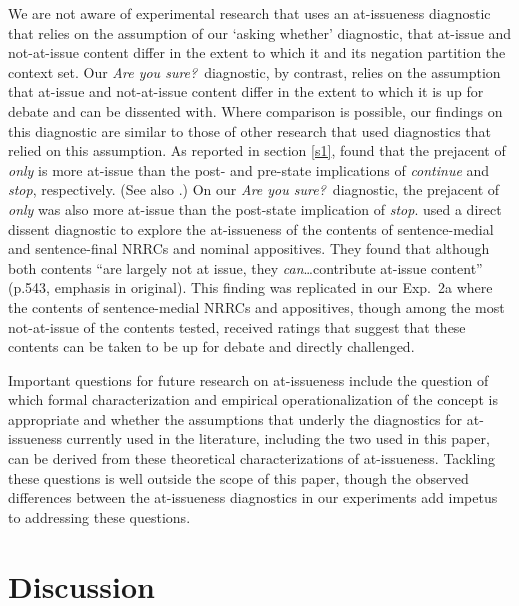 \documentclass[11pt,fleqn]{article}
\newcommand{\6}{\mbox{$[\hspace*{-.6mm}[$}}
\newcommand{\9}{\mbox{$]\hspace*{-.6mm}]$}}
\begin{document}
We are not aware of experimental research that uses an at-issueness diagnostic that relies on the assumption of our `asking whether' diagnostic, that at-issue and not-at-issue content differ in the extent to which it and its negation partition the context set. Our {\em Are you sure?}~diagnostic, by contrast, relies on the assumption that at-issue and not-at-issue content differ in the extent to which it is up for debate and can be dissented with. Where comparison is possible, our findings on this diagnostic are similar to those of other research that used diagnostics that relied on this assumption. As reported in section \ref{s1}, \citet{amaral-etal11} found that the prejacent of {\em only} is more at-issue than the post- and pre-state implications of {\em continue} and {\em stop}, respectively. (See also \citealt{cummins-etal2012}.) On our {\em Are you sure?}~diagnostic, the prejacent of {\em only} was also more at-issue than the post-state implication of {\em stop}. \citet{syrett-koev2015} used a direct dissent diagnostic to explore the at-issueness of the contents of sentence-medial and sentence-final NRRCs and nominal appositives. They found that although both contents ``are largely not at issue, they {\em can}\ldots contribute at-issue content'' (p.543, emphasis in original). This finding was replicated in our Exp.~2a where the contents of sentence-medial NRRCs and appositives, though among the most not-at-issue of the contents tested, received ratings that suggest that these contents can be taken to be up for debate and directly challenged.

Important questions for future research on at-issueness include the question of which formal characterization and empirical operationalization of the concept is appropriate and whether the assumptions that underly the diagnostics for at-issueness currently used in the literature, including the two used in this paper, can be derived from these theoretical characterizations of at-issueness. Tackling these questions is well outside the scope of this paper, though the observed differences between the at-issueness diagnostics in our experiments add impetus to addressing these questions.


 



\section{Discussion}\label{s5}
\end{document}
